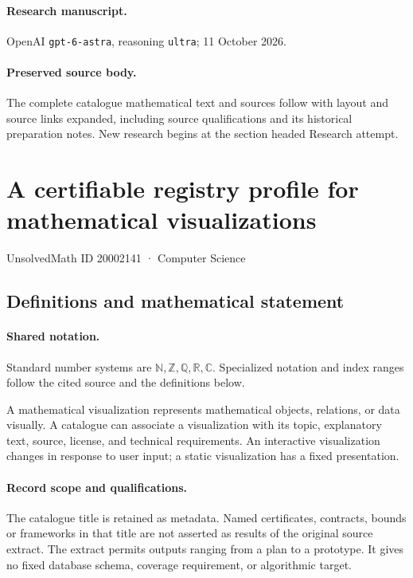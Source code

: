 \documentclass[11pt]{article}
\begin{document}
\paragraph{Research manuscript.} OpenAI \texttt{gpt-6-astra}, reasoning \texttt{ultra}; 11 October 2026.
\paragraph{Preserved source body.} The complete catalogue mathematical text and sources follow with layout and source links expanded, including source qualifications and its historical preparation notes. New research begins at the section headed Research attempt.

\section{A certifiable registry profile for mathematical visualizations}\label{20002141}
{\small UnsolvedMath ID 20002141 · Computer Science}
\subsection{Definitions and mathematical statement}

\paragraph{Shared notation.}Standard number systems are $\mathbb N,\mathbb Z,\mathbb Q,\mathbb R,\mathbb C$. Specialized notation and index ranges follow the cited source and the definitions below.


A mathematical visualization represents mathematical objects, relations, or data visually. A catalogue can associate a visualization with its topic, explanatory text, source, license, and technical requirements. An interactive visualization changes in response to user input; a static visualization has a fixed presentation.
\paragraph{Record scope and qualifications.}
The catalogue title is retained as metadata. Named certificates, contracts, bounds or frameworks in that title are not asserted as results of the original source extract.
The extract permits outputs ranging from a plan to a prototype. It gives no fixed database schema, coverage requirement, or algorithmic target.
\end{document}
